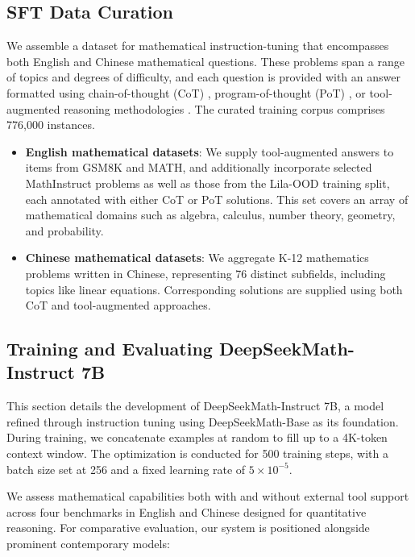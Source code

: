 \subsection{SFT Data Curation}

We assemble a dataset for mathematical instruction-tuning that encompasses both English and Chinese mathematical questions. These problems span a range of topics and degrees of difficulty, and each question is provided with an answer formatted using chain-of-thought (CoT) \citep{cot}, program-of-thought (PoT) \citep{pot,pal}, or tool-augmented reasoning methodologies \citep{tora}. The curated training corpus comprises 776,000 instances.

\begin{itemize}[topsep=0pt]
    \item \textbf{English mathematical datasets}: We supply tool-augmented answers to items from GSM8K and MATH, and additionally incorporate selected MathInstruct \citep{MathInstruct} problems as well as those from the Lila-OOD \citep{lila} training split, each annotated with either CoT or PoT solutions. This set covers an array of mathematical domains such as algebra, calculus, number theory, geometry, and probability.
    \item \textbf{Chinese mathematical datasets}: We aggregate K-12 mathematics problems written in Chinese, representing 76 distinct subfields, including topics like linear equations. Corresponding solutions are supplied using both CoT and tool-augmented approaches.
\end{itemize}

\subsection{Training and Evaluating DeepSeekMath-Instruct 7B}

This section details the development of DeepSeekMath-Instruct 7B, a model refined through instruction tuning using DeepSeekMath-Base as its foundation. During training, we concatenate examples at random to fill up to a 4K-token context window. The optimization is conducted for 500 training steps, with a batch size set at 256 and a fixed learning rate of $5 \times 10^{-5}$.

We assess mathematical capabilities both with and without external tool support across four benchmarks in English and Chinese designed for quantitative reasoning. For comparative evaluation, our system is positioned alongside prominent contemporary models:

